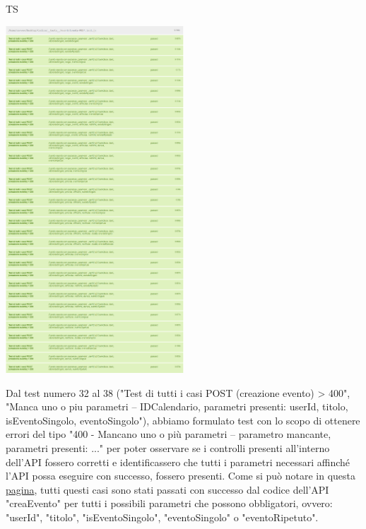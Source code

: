 \begin{listaPersonale}{TS}
\begin{center}
                        \includegraphics[width=0.5\textwidth, height=0.6\textheight]{img/png/tests/EventoPost/200_PostEvento.png}
                \end{center}
                Dal test numero 32 al 38 ("Test di tutti i casi POST (creazione evento) > 400", "Manca uno o piu parametri -- IDCalendario, parametri presenti: userId, titolo, isEventoSingolo, eventoSingolo"), abbiamo formulato test con lo scopo di ottenere errori del tipo "400 - Mancano uno o più parametri -- parametro mancante, parametri presenti: ..." per poter osservare se i controlli presenti all'interno dell'API fossero corretti e identificassero che tutti i parametri necessari affinché l'API possa eseguire con successo, fossero presenti. Come si può notare in questa \href{https://plan-it.it/test-report.html} {pagina}, tutti questi casi sono stati passati con successo dal codice dell'API "creaEvento" per tutti i possibili parametri che possono obbligatori, ovvero: "userId", "titolo", "isEventoSingolo", "eventoSingolo" o "eventoRipetuto". \\
                \begin{center}

\end{center}
\end{listaPersonale}
